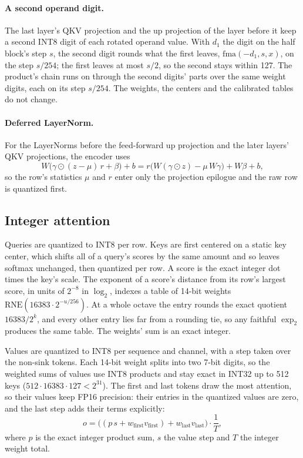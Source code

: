 \documentclass[10pt]{article}
\begin{document}
\paragraph{A second operand digit.}
The last layer's QKV projection and the up projection of the layer before it
keep a second INT8 digit of each rotated operand value. With $d_1$ the digit
on the half block's step $s$, the second digit rounds what the first leaves,
$\mathrm{fma}(-d_1, s, x)$, on the step $s/254$; the first leaves at most
$s/2$, so the second stays within 127. The product's chain runs on through the
second digits' parts over the same weight digits, each on its step $s/254$.
The weights, the centers and the calibrated tables do not change.

\paragraph{Deferred LayerNorm.}
For the LayerNorms before the feed-forward up projection and the later layers'
QKV projections, the encoder uses
\begin{equation}
W\bigl(\gamma \odot (z - \mu)\,r + \beta\bigr) + b
= r\bigl(W(\gamma \odot z) - \mu\,W\gamma\bigr) + W\beta + b,
\end{equation}
so the row's statistics $\mu$ and $r$ enter only the projection epilogue and
the raw row is quantized first.

\subsection{Integer attention}

Queries are quantized to INT8 per row. Keys are first centered on a static
key center, which shifts all of a query's scores by the same amount and so
leaves softmax unchanged, then quantized per row. A score is the exact integer
dot times the key's scale. The exponent of a score's distance from its row's
largest score, in units of $2^{-8}$ in $\log_2$, indexes a table of 14-bit
weights $\mathrm{RNE}(16383 \cdot 2^{-u/256})$. At a whole octave the entry
rounds the exact quotient $16383 / 2^k$, and every other entry lies far from
a rounding tie, so any faithful $\exp_2$ produces the same table. The
weights' sum is an exact integer.

Values are quantized to INT8 per sequence and channel, with a step taken over
the non-sink tokens. Each 14-bit weight splits into two 7-bit digits, so the
weighted sums of values use INT8 products and stay exact in INT32 up to 512
keys ($512 \cdot 16383 \cdot 127 < 2^{31}$). The first and last tokens draw the
most attention, so their values keep FP16 precision: their entries in the
quantized values are zero, and the last step adds their terms explicitly:
\begin{equation}
o = \bigl((p\,s + w_{\mathrm{first}} v_{\mathrm{first}})
      + w_{\mathrm{last}} v_{\mathrm{last}}\bigr)\cdot\frac{1}{T},
\end{equation}
where $p$ is the exact integer product sum, $s$ the value step and $T$ the
integer weight total.
\end{document}
